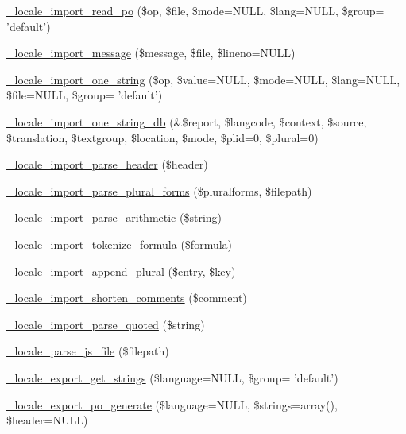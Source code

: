 \begin{DoxyCompactItemize}
\item 
\hyperlink{group__locale_ga97099fd0b115843fd4d443686a3ca35d}{\_\-locale\_\-import\_\-read\_\-po} (\$op, \$file, \$mode=NULL, \$lang=NULL, \$group= 'default')
\item 
\hyperlink{group__locale_gaa6bdc2dc6954e30cabefa65ca596e9d0}{\_\-locale\_\-import\_\-message} (\$message, \$file, \$lineno=NULL)
\item 
\hyperlink{group__locale_gac065dc774e2258493b661c45c455c709}{\_\-locale\_\-import\_\-one\_\-string} (\$op, \$value=NULL, \$mode=NULL, \$lang=NULL, \$file=NULL, \$group= 'default')
\item 
\hyperlink{group__locale_ga3f27e3894d1e98f2a0580834ebf51e4e}{\_\-locale\_\-import\_\-one\_\-string\_\-db} (\&\$report, \$langcode, \$context, \$source, \$translation, \$textgroup, \$location, \$mode, \$plid=0, \$plural=0)
\item 
\hyperlink{group__locale_ga1381fc54e922fe478d8ee5cfbe0c3c16}{\_\-locale\_\-import\_\-parse\_\-header} (\$header)
\item 
\hyperlink{group__locale_ga7693cf526c48e5dcb6dffabac7deb775}{\_\-locale\_\-import\_\-parse\_\-plural\_\-forms} (\$pluralforms, \$filepath)
\item 
\hyperlink{group__locale_gafec8dc8c1a6f8a0c70b5280c3a520c63}{\_\-locale\_\-import\_\-parse\_\-arithmetic} (\$string)
\item 
\hyperlink{group__locale_ga53c242ca7adfb5ccc25ebfedab8214a5}{\_\-locale\_\-import\_\-tokenize\_\-formula} (\$formula)
\item 
\hyperlink{group__locale_gad0abff75e696db162d5b90acda071371}{\_\-locale\_\-import\_\-append\_\-plural} (\$entry, \$key)
\item 
\hyperlink{group__locale_ga1cba05a4c159b1ed844f18ba484cc8e7}{\_\-locale\_\-import\_\-shorten\_\-comments} (\$comment)
\item 
\hyperlink{group__locale_gaac1954e79c57539b5599ff4ed7379df7}{\_\-locale\_\-import\_\-parse\_\-quoted} (\$string)
\item 
\hyperlink{locale_8inc_a99a08903312f70ac95f490bdd9e1e6f1}{\_\-locale\_\-parse\_\-js\_\-file} (\$filepath)
\item 
\hyperlink{group__locale_gade17be27a5240ba4804dc51eccf40246}{\_\-locale\_\-export\_\-get\_\-strings} (\$language=NULL, \$group= 'default')
\item 
\hyperlink{group__locale_ga694b7e78936d2875e18ef4c8171b7eb8}{\_\-locale\_\-export\_\-po\_\-generate} (\$language=NULL, \$strings=array(), \$header=NULL)
\item 

\end{DoxyCompactItemize}
